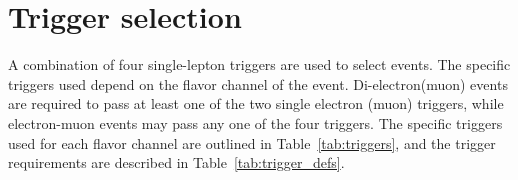 \section{Trigger selection}
\label{sec:trigger_selection}

A combination of four single-lepton triggers are used to select events.
The specific triggers used depend on the flavor channel of the event.
Di-electron(muon) events are required to pass at least one of the two single
electron (muon) triggers, while electron-muon events may pass any one of the
four triggers.
The specific triggers used for each flavor channel are outlined in
Table~\ref{tab:triggers}, and the trigger requirements are described in
Table~\ref{tab:trigger_defs}.

\begin{table}[ht]
  \caption{Trigger selection for each final state. If the event passes any of
    the triggers for the given final state, the event is accepted.
  }
  \label{tab:triggers}
\end{table}

